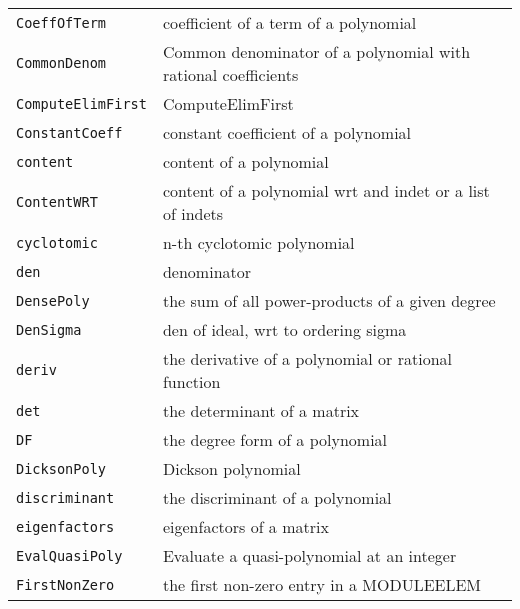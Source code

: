 \documentclass[a4paper]{mybook}
\begin{document}
\begin{center}
\begin{longtable}{ll}
{\verb~CoeffOfTerm~} &
      coefficient of a term of a polynomial\\
   
{\verb~CommonDenom~} &
      Common denominator of a polynomial with rational coefficients\\
   
{\verb~ComputeElimFirst~} &
      ComputeElimFirst\\
   
{\verb~ConstantCoeff~} &
      constant coefficient of a polynomial\\
   
{\verb~content~} &
      content of a polynomial\\
   
{\verb~ContentWRT~} &
      content of a polynomial wrt and indet or a list of indets\\
   
{\verb~cyclotomic~} &
      n-th cyclotomic polynomial\\
   
{\verb~den~} &
      denominator\\
   
{\verb~DensePoly~} &
      the sum of all power-products of a given degree\\
   
{\verb~DenSigma~} &
      den of ideal, wrt to ordering sigma\\
   
{\verb~deriv~} &
      the derivative of a polynomial or rational function\\
   
{\verb~det~} &
      the determinant of a matrix\\
   
{\verb~DF~} &
      the degree form of a polynomial\\
   
{\verb~DicksonPoly~} &
      Dickson polynomial\\
   
{\verb~discriminant~} &
      the discriminant of a polynomial\\
   
{\verb~eigenfactors~} &
      eigenfactors of a matrix\\
   
{\verb~EvalQuasiPoly~} &
      Evaluate a quasi-polynomial at an integer\\
   
{\verb~FirstNonZero~} &
      the first non-zero entry in a MODULEELEM\\
   

\end{longtable}
\end{center}
\end{document}

